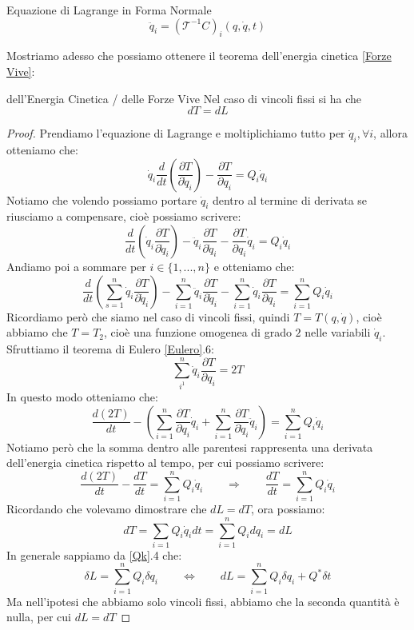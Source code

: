 \documentclass[11pt,a4paper,twoside]{article}
\theoremstyle{definition}
\begin{document}
\begin{defn}{Equazione di Lagrange in Forma Normale}{}
	\[ \ddot q_i = (\mathscr T^{-1}C)_i (q,\dot q, t) \]
\end{defn}

Mostriamo adesso che possiamo ottenere il teorema dell'energia cinetica \ref{Forze Vive}:
\begin{thm}{dell'Energia Cinetica / delle Forze Vive}{}
	Nel caso di vincoli fissi si ha che
	\[ dT = dL \]
\end{thm}
\begin{proof}
	Prendiamo l'equazione di Lagrange e moltiplichiamo tutto per $\dot q_i, \forall i$, allora otteniamo che:
	\[ \dot q_i \frac d{dt} \left( \frac{\partial T}{\partial \dot q_i} \right) - \frac{\partial T}{\partial q_i} = Q_i \dot q_i \]
	Notiamo che volendo possiamo portare $\dot q_i$ dentro al termine di derivata se riusciamo a compensare, cioè possiamo scrivere:
	\[ \frac{d}{dt} \left(\dot q_i \frac{\partial T}{\partial \dot q_i}\right) - \ddot q_i \frac{\partial T}{\partial \dot q_i} - \frac{\partial T}{\partial q_i} \dot q_i = Q_i \dot q_i \]
	Andiamo poi a sommare per $i \in \{1,...,n\}$ e otteniamo che:
	\[ \frac{d}{dt} \left( \sum_{s=1}^n \dot q_i \frac{\partial T}{\partial \dot q_i} \right) - \sum_{i=1}^n \ddot q_i \frac{\partial T}{\partial \dot q_i} - \sum_{i=1}^n \dot q_i \frac{\partial T}{\partial q_i} = \sum_{i=1}^n Q_i \dot q_i \]
	Ricordiamo però che siamo nel caso di vincoli fissi, quindi $T = T(q,\dot q)$, cioè abbiamo che $T =T_2$, cioè una funzione omogenea di grado $2$ nelle variabili $\dot q_i$. Sfruttiamo il teorema di Eulero \ref{Eulero}.6:
	\[ \sum_{i^1}^n \dot q_i \frac{\partial T}{\partial q_i} = 2T \]
	In questo modo otteniamo che:
	\[ \frac{d(2T)}{dt} - \left( \sum_{i=1}^n \frac{\partial T}{\partial q_i} \dot q_i + \sum_{i=1}^n \frac{\partial T}{\partial \dot q_i}\ddot q_i \right) = \sum_{i=1}^n Q_i\dot q_i \]
	Notiamo però che la somma dentro alle parentesi rappresenta una derivata dell'energia cinetica rispetto al tempo, per cui possiamo scrivere:
	\[ \frac{d(2T)}{dt} - \frac{dT}{dt} = \sum_{i=1}^n Q_i\dot q_i\qquad \Rightarrow \qquad \frac{dT}{dt} = \sum_{i=1}^n Q_i \dot q_i \]
	Ricordando che volevamo dimostrare che $dL = dT$, ora possiamo:
	\[ dT = \sum_{i=1}Q_i \dot q_i dt = \sum_{i=1}^n Q_i dq_i = dL \]
	In generale sappiamo da \ref{Qk}.4 che:
	\[ \delta L = \sum_{i=1}^n Q_i \delta q_i \qquad \Leftrightarrow \qquad dL =\sum_{i=1}^n Q_i \delta q_i + Q^* \delta t \]
	Ma nell'ipotesi che abbiamo solo vincoli fissi, abbiamo che la seconda quantità è nulla, per cui $dL = dT$
\end{proof}
\end{document}
